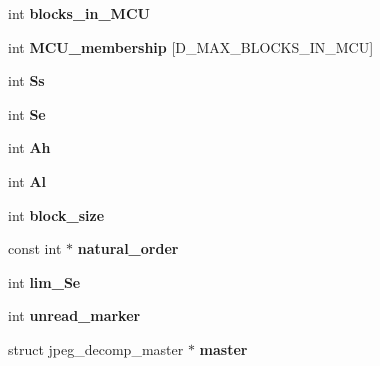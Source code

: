 \begin{DoxyCompactItemize}
int {\bfseries blocks\+\_\+in\+\_\+\+M\+CU}
\item 
\mbox{\label{structjpeg__decompress__struct_ad5030e75bdaa382cc54bdf628cf330b7}} 
int {\bfseries M\+C\+U\+\_\+membership} \mbox{[}D\+\_\+\+M\+A\+X\+\_\+\+B\+L\+O\+C\+K\+S\+\_\+\+I\+N\+\_\+\+M\+CU\mbox{]}
\item 
\mbox{\label{structjpeg__decompress__struct_a61133b3e8959b3ab4ead2b6e12761176}} 
int {\bfseries Ss}
\item 
\mbox{\label{structjpeg__decompress__struct_a978242a8eb6c75dbb86e8382470b2290}} 
int {\bfseries Se}
\item 
\mbox{\label{structjpeg__decompress__struct_a2df559c55319d0c785b91e95960bea55}} 
int {\bfseries Ah}
\item 
\mbox{\label{structjpeg__decompress__struct_a1dfbdcc8449dbc329a352a75d4046154}} 
int {\bfseries Al}
\item 
\mbox{\label{structjpeg__decompress__struct_a18f5caeead3dbaf5dfebf7aa08e3ee3f}} 
int {\bfseries block\+\_\+size}
\item 
\mbox{\label{structjpeg__decompress__struct_a8ac2949077bbd019f021b772cbc54c3a}} 
const int $\ast$ {\bfseries natural\+\_\+order}
\item 
\mbox{\label{structjpeg__decompress__struct_acd2e6ff14b5a6109ae04baf754dd5965}} 
int {\bfseries lim\+\_\+\+Se}
\item 
\mbox{\label{structjpeg__decompress__struct_a9a030e86e1bfd0a72c520e1d18b5eef9}} 
int {\bfseries unread\+\_\+marker}
\item 
\mbox{\label{structjpeg__decompress__struct_ab78978a31a4712b76e98bce8ec0c2321}} 
struct jpeg\+\_\+decomp\+\_\+master $\ast$ {\bfseries master}
\item 
\mbox{\label{structjpeg__decompress__struct_ac571a0d4440a05f285e726923dcfc237}} 

\end{DoxyCompactItemize}

